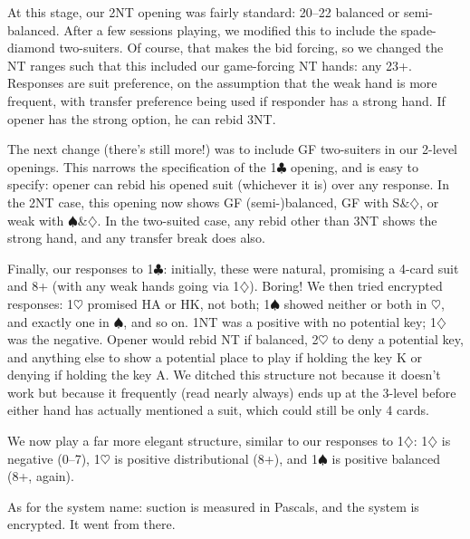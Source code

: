 \documentclass[a4paper,14pt]{extarticle}
\newcommand{\newevenside}{
	\ifthenelse{\isodd{\thepage}}{\newpage}{
	\newpage
	\textcolor{white}{placeholder} 
	\thispagestyle{empty}
	\newpage
	}
}
\begin{document}
At this stage, our 2NT opening was fairly standard: 20--22 balanced or
semi-balanced.  After a few sessions playing, we modified this to include the
spade-diamond two-suiters.  Of course, that makes the bid forcing, so we
changed the NT ranges such that this included our game-forcing NT hands: any
23+.  Responses are suit preference, on the assumption that the weak hand is
more frequent, with transfer preference being used if responder has a strong
hand.  If opener has the strong option, he can rebid 3NT.

The next change (there's still more!) was to include GF two-suiters in our
2-level openings.  This narrows the specification of the 1$\clubsuit$ opening, and is
easy to specify: opener can rebid his opened suit (whichever it is) over any
response.  In the 2NT case, this opening now shows GF (semi-)balanced, GF with
S\&$\diamondsuit$, or weak with $\spadesuit$\&$\diamondsuit$.  In the two-suited case, any rebid other than 3NT shows
the strong hand, and any transfer break does also.

Finally, our responses to 1$\clubsuit$: initially, these were natural, promising a 4-card
suit and 8+ (with any weak hands going via 1$\diamondsuit$).  Boring!  We then tried
encrypted responses: 1$\heartsuit$ promised HA or HK, not both; 1$\spadesuit$ showed neither or both
in $\heartsuit$, and exactly one in $\spadesuit$, and so on.  1NT was a positive with no potential
key; 1$\diamondsuit$ was the negative.  Opener would rebid NT if balanced, 2$\heartsuit$ to deny a
potential key, and anything else to show a potential place to play if holding
the key K or denying if holding the key A.  We ditched this structure not
because it doesn't work but because it frequently (read nearly always) ends up
at the 3-level before either hand has actually mentioned a suit, which could
still be only 4 cards.

We now play a far more elegant structure, similar to our responses to 1$\diamondsuit$: 1$\diamondsuit$ is
negative (0--7), 1$\heartsuit$ is positive distributional (8+), and 1$\spadesuit$ is positive balanced
(8+, again).

As for the system name: suction is measured in Pascals, and the system is
encrypted.  It went from there.

\newevenside

\def\thesection{\Alph{section}}
\setcounter{section}{0}

\small

\end{document}
